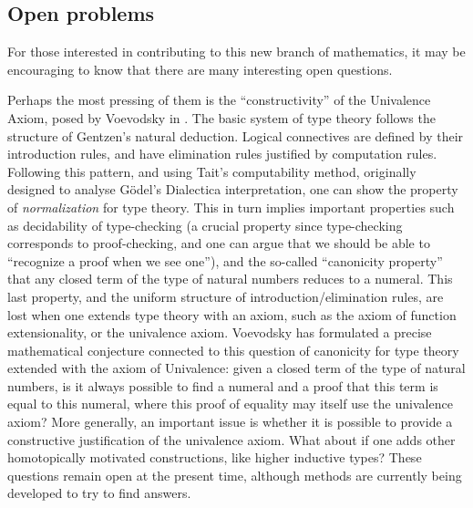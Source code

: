 %

\subsection*{Open problems} 

%

For those interested in contributing to this new branch of mathematics, it may be encouraging to know that there are many interesting open questions.

%
Perhaps the most pressing of them is the ``constructivity'' of the Univalence Axiom, posed by Voevodsky in \cite{Universe-poly}.
The basic system of type theory follows the structure of Gentzen's natural deduction. Logical connectives are defined by their introduction rules, and have elimination rules justified by computation rules. Following this pattern, and using Tait's computability method, originally designed to analyse G\"odel's Dialectica interpretation, one can show the property of \emph{normalization} for type theory. This in turn implies important properties such as decidability of type-checking (a crucial property since type-checking corresponds to proof-checking, and one can argue that we should be able to ``recognize a proof when we see one''), and the so-called ``canonicity property'' that any closed term of the type of natural numbers reduces to a numeral. This last property, and the uniform structure of introduction/elimination rules, are lost when one extends type theory with an axiom, such as the axiom of function extensionality, or the univalence axiom. Voevodsky has formulated a precise mathematical conjecture connected to this question of canonicity for type theory extended with the axiom of Univalence: given a closed term of the type of natural numbers, is it always possible to find a numeral and a proof that this term is equal to this numeral, where this proof of equality may itself use the univalence axiom? More generally, an important issue is whether it is possible to provide a constructive justification of the univalence axiom.
What about if one adds other homotopically motivated constructions, like higher inductive types?
These questions remain open at the present time, although methods are currently being developed to try to find answers.

